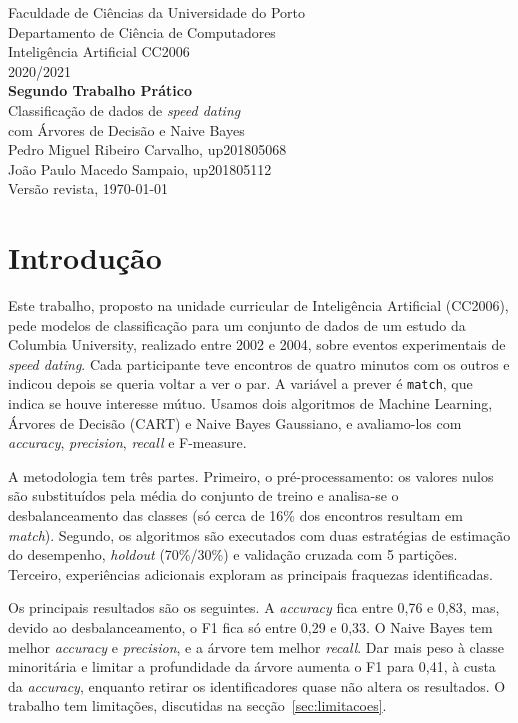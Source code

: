 \documentclass[12pt,a4paper]{article}
\newcommand{\code}[1]{\texttt{#1}}
\begin{document}
\begin{titlepage}
  \thispagestyle{empty}
  \centering
  \vspace*{1cm}
  {\large Faculdade de Ciências da Universidade do Porto\\ Departamento de Ciência de Computadores}\\[2.5cm]
  {\Large Inteligência Artificial CC2006}\\[0.4cm]
  {\large 2020/2021}\\[2cm]
  {\Huge\bfseries Segundo Trabalho Prático}\\[0.8cm]
  {\LARGE Classificação de dados de \emph{speed dating}\\ com Árvores de Decisão e Naive Bayes}\\[3cm]
  {\large
  Pedro Miguel Ribeiro Carvalho, up201805068\\[0.3em]
  João Paulo Macedo Sampaio, up201805112}\\[\fill]
  Versão revista, \today
\end{titlepage}

\tableofcontents
\listoffigures
\listoftables

\clearpage
\section{Introdução}

Este trabalho, proposto na unidade curricular de Inteligência Artificial (CC2006), pede modelos de classificação para um conjunto de dados de um estudo da Columbia University, realizado entre 2002 e 2004, sobre eventos experimentais de \emph{speed dating}. Cada participante teve encontros de quatro minutos com os outros e indicou depois se queria voltar a ver o par. A variável a prever é \code{match}, que indica se houve interesse mútuo. Usamos dois algoritmos de Machine Learning, Árvores de Decisão (CART) e Naive Bayes Gaussiano, e avaliamo-los com \emph{accuracy}, \emph{precision}, \emph{recall} e F-measure.

A metodologia tem três partes. Primeiro, o pré-processamento: os valores nulos são substituídos pela média do conjunto de treino e analisa-se o desbalanceamento das classes (só cerca de 16\% dos encontros resultam em \emph{match}). Segundo, os algoritmos são executados com duas estratégias de estimação do desempenho, \emph{holdout} (70\%/30\%) e validação cruzada com 5 partições. Terceiro, experiências adicionais exploram as principais fraquezas identificadas.

Os principais resultados são os seguintes. A \emph{accuracy} fica entre 0,76 e 0,83, mas, devido ao desbalanceamento, o F1 fica só entre 0,29 e 0,33. O Naive Bayes tem melhor \emph{accuracy} e \emph{precision}, e a árvore tem melhor \emph{recall}. Dar mais peso à classe minoritária e limitar a profundidade da árvore aumenta o F1 para 0,41, à custa da \emph{accuracy}, enquanto retirar os identificadores quase não altera os resultados. O trabalho tem limitações, discutidas na secção~\ref{sec:limitacoes}.
\end{document}
